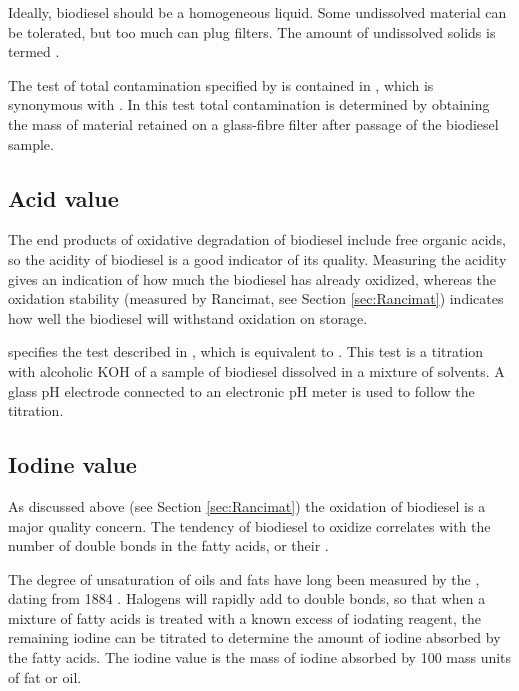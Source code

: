 Ideally, biodiesel should be a homogeneous liquid. Some undissolved material can
be tolerated, but too much can plug filters. The amount of undissolved solids is
termed .

The test of total contamination specified by  is contained in
, which is synonymous with . In this test total
contamination is determined by obtaining the mass of material retained on a
glass-fibre filter after passage of the biodiesel sample.

\subsection{Acid value}

The end products of oxidative degradation of biodiesel include free organic
acids, so the acidity of biodiesel is a good indicator of its quality. Measuring
the acidity gives an indication of how much the biodiesel has already oxidized,
whereas the oxidation stability (measured by Rancimat, see
Section \ref{sec:Rancimat}) indicates how well the biodiesel will withstand
oxidation on storage.

 specifies the test described in , which is
equivalent to . This test is a titration with alcoholic KOH of a
sample of biodiesel dissolved in a mixture of solvents. A glass pH electrode
connected to an electronic pH meter is used to follow the titration.

\subsection{Iodine value}

As discussed above (see Section \ref{sec:Rancimat}) the oxidation of biodiesel
is a major quality concern. The tendency of biodiesel to oxidize correlates with
the number of double bonds in the fatty acids, or their .


The degree of unsaturation of oils and fats have long been measured by the
, dating from 1884 \autocite{Knothe2007}. Halogens will
rapidly add to double bonds, so that when a mixture of fatty acids is treated
with a known excess of iodating reagent, the remaining iodine can be titrated to
determine the amount of iodine absorbed by the fatty acids. The iodine value is
the mass of iodine absorbed by 100 mass units of fat or oil.

